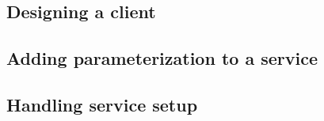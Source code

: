 \subsection{Designing a client}

\subsection{Adding parameterization to a service}

\subsection{Handling service setup}


%     


%     
